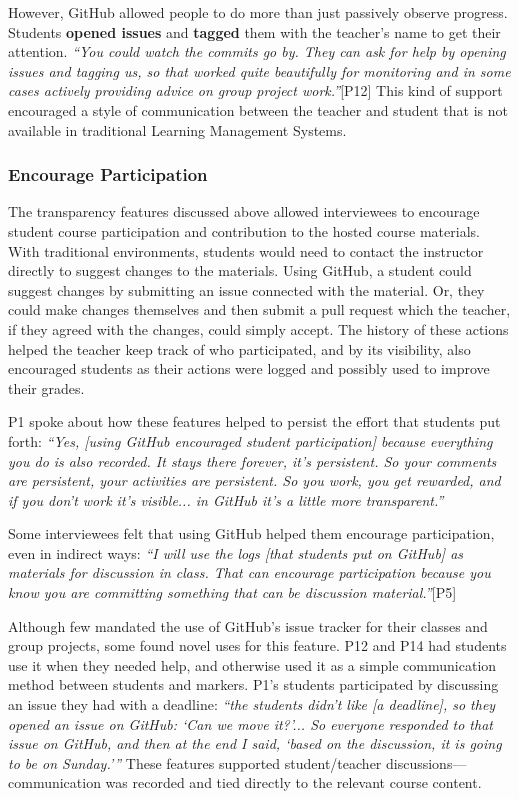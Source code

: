 However, GitHub allowed people to do more than just passively observe progress. Students \textbf{opened issues} and \textbf{tagged} them with the teacher's name to get their attention. \textit{``You could watch the commits go by. They can ask for help by opening issues and tagging us, so that worked quite beautifully for monitoring and in some cases actively providing advice on group project work.''}[P12] This kind of support encouraged a style of communication between the teacher and student that is not available in traditional Learning Management Systems.

\subsubsection{Encourage Participation}
The transparency features discussed above allowed interviewees to encourage student course participation and contribution to the hosted course materials. With traditional environments, students would need to contact the instructor directly to suggest changes to the materials. Using GitHub, a student could suggest changes by submitting an issue connected with the material. Or, they could make changes themselves and then submit a pull request which the teacher, if they agreed with the changes, could simply accept. The history of these actions helped the teacher keep track of who participated, and by its visibility, also encouraged students as their actions were logged and possibly used to improve their grades.

P1 spoke about how these features helped to persist the effort that students put forth:
\textit{``Yes, [using GitHub encouraged student participation] because everything you do is also recorded. It stays there forever, it's persistent. So your comments are persistent, your activities are persistent. So you work, you get rewarded, and if you don't work it's visible... in GitHub it's a little more transparent.''}

Some interviewees felt that using GitHub helped them encourage participation, even in indirect ways: \textit{``I will use the logs [that students put on GitHub] as materials for discussion in class. That can encourage participation because you know you are committing something that can be discussion material.''}[P5]

Although few mandated the use of GitHub's issue tracker for their classes and group projects, some found novel uses for this feature. P12 and P14 had students use it when they needed help, and otherwise used it as a simple communication method between students and markers. P1's students participated by discussing an issue they had with a deadline: \textit{``the students didn't like [a deadline], so they opened an issue on GitHub: `Can we move it?'... So everyone responded to that issue on GitHub, and then at the end I said, `based on the discussion, it is going to be on Sunday.'''} These features supported student/teacher discussions---communication was recorded and tied directly to the relevant course content.

